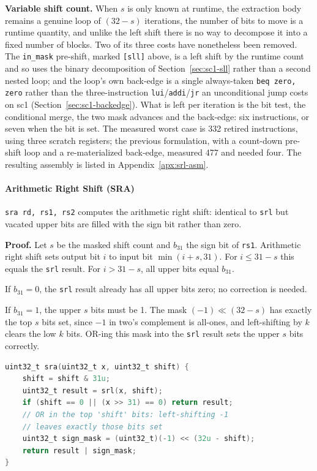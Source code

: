 \textbf{Variable shift count.} When $s$ is only known at runtime, the extraction body remains a
genuine loop of $(32 - s)$ iterations, the number of bits to move is a runtime quantity, and unlike
the left shift there is no way to decompose it into a fixed number of blocks. Two of its three costs
have nonetheless been removed. The \texttt{in\_mask} pre-shift, marked \texttt{[sll]} above, is a left
shift by the runtime count and so uses the binary decomposition of Section~\ref{sec:sc1-sll} rather
than a second nested loop; and the loop's own back-edge is a single always-taken
\texttt{beq zero, zero} rather than the three-instruction \texttt{lui}/\texttt{addi}/\texttt{jr} an
unconditional jump costs on sc1 (Section~\ref{sec:sc1-backedge}). What is left per iteration is the
bit test, the conditional merge, the two mask advances and the back-edge: six instructions, or seven
when the bit is set. The measured worst case is 332 retired instructions, using three scratch
registers; the previous formulation, with a count-down pre-shift loop and a re-materialized
back-edge, measured 477 and needed four. The resulting assembly is listed in
Appendix~\ref{apx:srl-asm}.

\paragraph{Arithmetic Right Shift (SRA)} \label{sec:sc1-sra}

\texttt{sra rd, rs1, rs2} computes the arithmetic right shift: identical to \texttt{srl} but vacated
upper bits are filled with the sign bit rather than zero.

\textbf{Proof.} Let $s$ be the masked shift count and $b_{31}$ the sign bit of \texttt{rs1}.
Arithmetic right shift sets output bit $i$ to input bit $\min(i+s, 31)$. For $i \leq 31-s$ this
equals the \texttt{srl} result. For $i > 31-s$, all upper bits equal $b_{31}$.

If $b_{31} = 0$, the \texttt{srl} result already has all upper bits zero; no correction is needed.

If $b_{31} = 1$, the upper $s$ bits must be 1. The mask $(-1) \ll (32 - s)$ has exactly the top $s$
bits set, since $-1$ in two's complement is all-ones, and left-shifting by $k$ clears the low $k$
bits. OR-ing this mask into the \texttt{srl} result sets the upper $s$ bits correctly.

\begin{lstlisting}[language=C]
uint32_t sra(uint32_t x, uint32_t shift) {
    shift = shift & 31u;
    uint32_t result = srl(x, shift);
    if (shift == 0 || (x >> 31) == 0) return result;
    // OR in the top 'shift' bits: left-shifting -1
    // leaves exactly those bits set
    uint32_t sign_mask = (uint32_t)(-1) << (32u - shift);
    return result | sign_mask;
}
\end{lstlisting}

